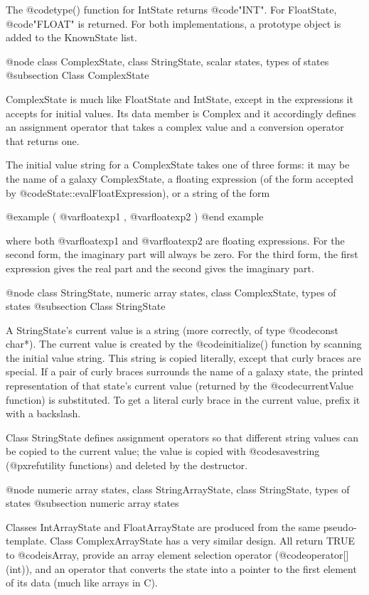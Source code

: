 The @code{type()} function for IntState returns @code{"INT"}.
For FloatState, @code{"FLOAT"} is returned.  For both implementations, a
prototype object is added to the KnownState list.

@node class ComplexState, class StringState, scalar states, types of states
@subsection Class ComplexState

ComplexState is much like FloatState and IntState, except in the
expressions it accepts for initial values.  Its data member is
Complex and it accordingly defines an assignment operator that takes a
complex value and a conversion operator that returns one.

The initial value string for a ComplexState takes one of three forms:
it may be the name of a galaxy ComplexState, a floating expression
(of the form accepted by @code{State::evalFloatExpression}), or a
string of the form

@example
( @var{floatexp1} , @var{floatexp2} )
@end example

where both @var{floatexp1} and @var{floatexp2} are floating expressions.
For the second form, the imaginary part will always be zero.  For the
third form, the first expression gives the real part and the second
gives the imaginary part.

@node class StringState, numeric array states, class ComplexState, types of states
@subsection Class StringState

A StringState's current value is a string (more correctly, of type
@code{const char*}).  The current value is created by the
@code{initialize()} function by scanning the initial value string.
This string is copied literally, except that curly braces are special.
If a pair of curly braces surrounds the name of a galaxy state, the
printed representation of that state's current value (returned by
the @code{currentValue} function) is substituted.  To get a literal
curly brace in the current value, prefix it with a backslash.

Class StringState defines assignment operators so that different
string values can be copied to the current value; the value is
copied with @code{savestring} (@pxref{utility functions})
and deleted by the destructor.

@node numeric array states, class StringArrayState, class StringState, types of states
@subsection numeric array states

Classes IntArrayState and FloatArrayState are produced from the same
pseudo-template.  Class ComplexArrayState has a very similar design.
All return TRUE to @code{isArray}, provide an array element selection
operator (@code{operator[](int)}), and an operator that converts
the state into a pointer to the first element of its data (much like
arrays in C).

